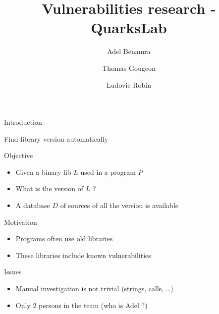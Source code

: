 \documentclass[11pt]{beamer}
\author{Adel Benamra \and Thomas Gougeon \and Ludovic Robin}
\title{Vulnerabilities research - QuarksLab}
\begin{document}
\begin{frame}
\titlepage
\end{frame}

\begin{frame}
\tableofcontents
\end{frame}

\begin{frame}{Introduction}

\end{frame}


\begin{frame}{Find library version automatically}

\begin{block}{Objective}
	\begin{itemize}
		\item Given a binary lib $L$ used in a program $P$
		\item What is the version of $L$ ?
		\item A database $D$ of sources of all the version is available
	\end{itemize}
\end{block}

\begin{block}{Motivation}
	\begin{itemize}
		\item Programs often use old libraries
		\item These libraries include known vulnerabilities
	\end{itemize}
\end{block}

\begin{block}{Issues}
	\begin{itemize}
		\item Manual investigation is not trivial (strings, calls, \dots)
		\item Only $2$ persons in the team (who is Adel ?)
	\end{itemize}

\end{block}

\end{frame}
\end{document}
